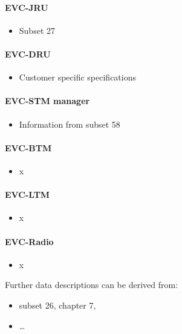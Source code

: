 \documentclass{template/openetcs_article}
\begin{document}
\paragraph{EVC-JRU}
\begin{itemize}
\item Subset 27
\end{itemize}

\paragraph{EVC-DRU}
\begin{itemize}
\item Customer specific specifications
\end{itemize}

\paragraph{EVC-STM manager}
\begin{itemize}
\item Information from subset 58
\end{itemize}

\paragraph{EVC-BTM}
\begin{itemize}
\item x
\end{itemize}

\paragraph{EVC-LTM}
\begin{itemize}
\item x
\end{itemize}

\paragraph{EVC-Radio}
\begin{itemize}
\item x
\end{itemize}



Further data descriptions can be derived from:

\begin{itemize}
\item subset 26, chapter 7,
\item {\dots}
\end{itemize}
\end{document}
